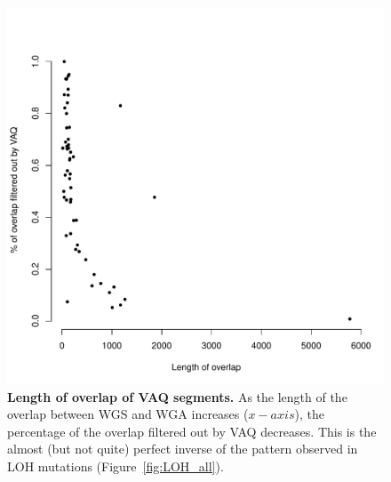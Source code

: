 \documentclass[11pt]{article} %
\begin{document}
\begin{figure}
\centerline{
\includegraphics[width=5in]{./LOH_VAQ/VAQ_all.pdf} }
\caption{ \textbf{Length of overlap of VAQ segments.} As the length of the overlap between WGS and WGA increases ($x-axis$), the percentage of the overlap filtered out by VAQ decreases. This is the almost (but not quite) perfect inverse of the pattern observed in LOH mutations (Figure~\ref{fig:LOH_all}).}
\label{fig:VAQ_all}
\end{figure}
\end{document}
